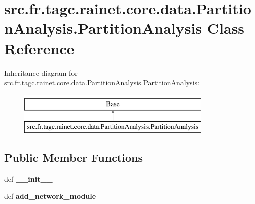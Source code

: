 \hypertarget{classsrc_1_1fr_1_1tagc_1_1rainet_1_1core_1_1data_1_1PartitionAnalysis_1_1PartitionAnalysis}{\section{src.\-fr.\-tagc.\-rainet.\-core.\-data.\-Partition\-Analysis.\-Partition\-Analysis Class Reference}
\label{classsrc_1_1fr_1_1tagc_1_1rainet_1_1core_1_1data_1_1PartitionAnalysis_1_1PartitionAnalysis}
}
Inheritance diagram for src.\-fr.\-tagc.\-rainet.\-core.\-data.\-Partition\-Analysis.\-Partition\-Analysis\-:\begin{figure}[H]
\begin{center}
\leavevmode
\includegraphics[height=2.000000cm]{classsrc_1_1fr_1_1tagc_1_1rainet_1_1core_1_1data_1_1PartitionAnalysis_1_1PartitionAnalysis}
\end{center}
\end{figure}
\subsection*{Public Member Functions}
\begin{DoxyCompactItemize}
\item 
\hypertarget{classsrc_1_1fr_1_1tagc_1_1rainet_1_1core_1_1data_1_1PartitionAnalysis_1_1PartitionAnalysis_a3def41c95a9adc9fc5cf31adcb2c0ccd}{def {\bfseries \-\_\-\-\_\-init\-\_\-\-\_\-}}\label{classsrc_1_1fr_1_1tagc_1_1rainet_1_1core_1_1data_1_1PartitionAnalysis_1_1PartitionAnalysis_a3def41c95a9adc9fc5cf31adcb2c0ccd}

\item 
\hypertarget{classsrc_1_1fr_1_1tagc_1_1rainet_1_1core_1_1data_1_1PartitionAnalysis_1_1PartitionAnalysis_a18d01e3f3fc532c1b0761877e4895b3b}{def {\bfseries add\-\_\-network\-\_\-module}}\label{classsrc_1_1fr_1_1tagc_1_1rainet_1_1core_1_1data_1_1PartitionAnalysis_1_1PartitionAnalysis_a18d01e3f3fc532c1b0761877e4895b3b}

\end{DoxyCompactItemize}
